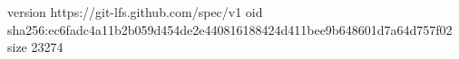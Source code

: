 version https://git-lfs.github.com/spec/v1
oid sha256:ec6fadc4a11b2b059d454de2e440816188424d411bee9b648601d7a64d757f02
size 23274
